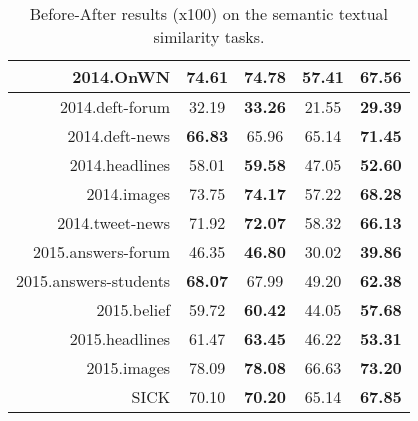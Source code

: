 \documentclass{article} \usepackage{acl2017,times}
\begin{document}
\begin{table}[!h]
\begin{tabular}{|r||c|c||c|c|}
2014.OnWN             & 74.61                      & \textbf{74.78}                      & 57.41                      & \textbf{67.56}                      \\ \hline
2014.deft-forum       & 32.19                      & \textbf{33.26}                      & 21.55                      & \textbf{29.39}                      \\ \hline
2014.deft-news        & \textbf{66.83}             & 65.96                               & 65.14                      & \textbf{71.45}                      \\ \hline
2014.headlines        & 58.01                      & \textbf{59.58}                      & 47.05                      & \textbf{52.60}                      \\ \hline
2014.images           & 73.75                      & \textbf{74.17}                      & 57.22                      & \textbf{68.28}                      \\ \hline
2014.tweet-news       & 71.92                      & \textbf{72.07}                      & 58.32                      & \textbf{66.13}                      \\ \hline
2015.answers-forum    & 46.35                      & \textbf{46.80}                      & 30.02                      & \textbf{39.86}                      \\ \hline
2015.answers-students & \textbf{68.07}             & 67.99                               & 49.20                      & \textbf{62.38}                      \\ \hline
2015.belief           & 59.72                      & \textbf{60.42}                      & 44.05                      & \textbf{57.68}                      \\ \hline
2015.headlines        & 61.47                      & \textbf{63.45}                      & 46.22                      & \textbf{53.31}                      \\ \hline
2015.images           & 78.09                      & \textbf{78.08}                      & 66.63                      & \textbf{73.20}                      \\ \hline
SICK                  & 70.10                      & \textbf{70.20}                      & 65.14                      & \textbf{67.85}                      \\ \hline
\end{tabular}
\caption{Before-After results (x100) on the semantic textual similarity tasks.}
\label{tb:sts:detail}
\end{table}
\end{document}
